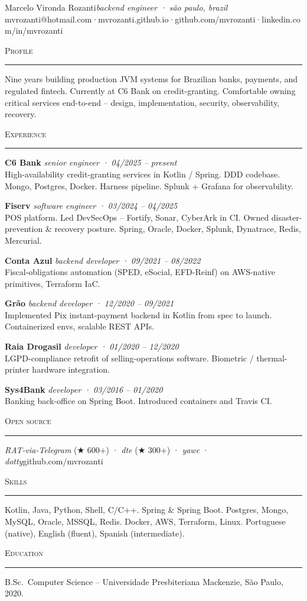 \documentclass[10pt,a4paper]{article}
\newcommand{\sectionrule}[1]{\par\medskip\noindent\textsc{\small #1}\par\vspace{-2pt}\noindent\rule{2cm}{0.4pt}\par\smallskip}
\begin{document}
\noindent
{\Large Marcelo Vironda Rozanti}\hfill\textit{\color{muted}\small backend engineer · são paulo, brazil}\\
{\small mvrozanti@hotmail.com\quad·\quad mvrozanti.github.io\quad·\quad github.com/mvrozanti\quad·\quad linkedin.com/in/mvrozanti}

\sectionrule{Profile}

\noindent
Nine years building production JVM systems for Brazilian banks, payments, and regulated fintech. Currently at C6 Bank on credit-granting. Comfortable owning critical services end-to-end -- design, implementation, security, observability, recovery.

\sectionrule{Experience}

\noindent
\textbf{C6 Bank} \hfill \textit{senior engineer · 04/2025 -- present}\\
High-availability credit-granting services in Kotlin / Spring. DDD codebase. Mongo, Postgres, Docker. Harness pipeline. Splunk + Grafana for observability.

\medskip
\noindent
\textbf{Fiserv} \hfill \textit{software engineer · 03/2024 -- 04/2025}\\
POS platform. Led DevSecOps -- Fortify, Sonar, CyberArk in CI. Owned disaster-prevention \& recovery posture. Spring, Oracle, Docker, Splunk, Dynatrace, Redis, Mercurial.

\medskip
\noindent
\textbf{Conta Azul} \hfill \textit{backend developer · 09/2021 -- 08/2022}\\
Fiscal-obligations automation (SPED, eSocial, EFD-Reinf) on AWS-native primitives, Terraform IaC.

\medskip
\noindent
\textbf{Grão} \hfill \textit{backend developer · 12/2020 -- 09/2021}\\
Implemented Pix instant-payment backend in Kotlin from spec to launch. Containerized envs, scalable REST APIs.

\medskip
\noindent
\textbf{Raia Drogasil} \hfill \textit{developer · 01/2020 -- 12/2020}\\
LGPD-compliance retrofit of selling-operations software. Biometric / thermal-printer hardware integration.

\medskip
\noindent
\textbf{Sys4Bank} \hfill \textit{developer · 03/2016 -- 01/2020}\\
Banking back-office on Spring Boot. Introduced containers and Travis CI.

\sectionrule{Open source}
\noindent
\textit{RAT-via-Telegram} (★ 600+) · \textit{dte} (★ 300+) · \textit{yawc} · \textit{dotty}\hfill{\small github.com/mvrozanti}

\sectionrule{Skills}
\noindent
Kotlin, Java, Python, Shell, C/C++. Spring \& Spring Boot. Postgres, Mongo, MySQL, Oracle, MSSQL, Redis. Docker, AWS, Terraform, Linux. Portuguese (native), English (fluent), Spanish (intermediate).

\sectionrule{Education}
\noindent
B.Sc.\ Computer Science -- Universidade Presbiteriana Mackenzie, São Paulo, 2020.
\end{document}
